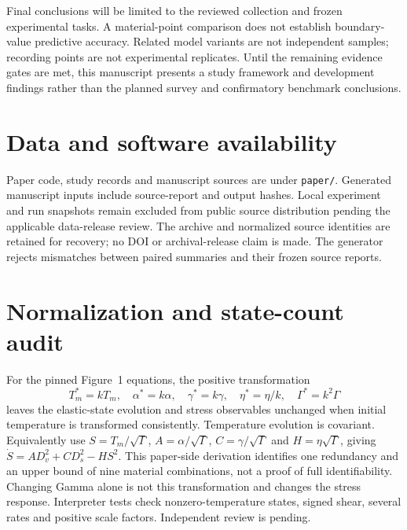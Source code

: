 \documentclass[11pt,a4paper]{article}
\begin{document}
Final conclusions will be limited to the reviewed collection and frozen experimental tasks. A material-point comparison does not establish boundary-value predictive accuracy. Related model variants are not independent samples; recording points are not experimental replicates. Until the remaining evidence gates are met, this manuscript presents a study framework and development findings rather than the planned survey and confirmatory benchmark conclusions.

\section*{Data and software availability}
Paper code, study records and manuscript sources are under \texttt{paper/}. Generated manuscript inputs include source-report and output hashes. Local experiment and run snapshots remain excluded from public source distribution pending the applicable data-release review. The archive and normalized source identities are retained for recovery; no DOI or archival-release claim is made. The generator rejects mismatches between paired summaries and their frozen source reports.

\appendix
\section{Normalization and state-count audit}\label{app:normalization}
For the pinned Figure~1 equations, the positive transformation
\[
T_m^*=kT_m,\quad\alpha^*=k\alpha,\quad\gamma^*=k\gamma,
\quad\eta^*=\eta/k,\quad\Gamma^*=k^2\Gamma
\]
leaves the elastic-state evolution and stress observables unchanged when initial temperature is transformed consistently. Temperature evolution is covariant. Equivalently use \(S=T_m/\sqrt\Gamma\), \(A=\alpha/\sqrt\Gamma\), \(C=\gamma/\sqrt\Gamma\) and \(H=\eta\sqrt\Gamma\), giving \(\dot S=A D_v^2+C D_s^2-HS^2\). This paper-side derivation identifies one redundancy and an upper bound of nine material combinations, not a proof of full identifiability. Changing Gamma alone is not this transformation and changes the stress response. Interpreter tests check nonzero-temperature states, signed shear, several rates and positive scale factors. Independent review is pending.
\end{document}
